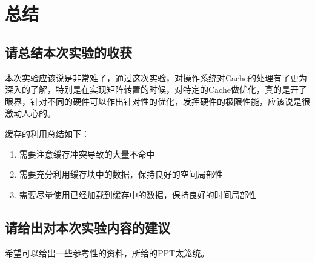 \section{总结}

\subsection{请总结本次实验的收获}
本次实验应该说是非常难了，通过这次实验，对操作系统对Cache的处理有了更为深入的了解，特别是在实现矩阵转置的时候，对特定的Cache做优化，真的是开了眼界，针对不同的硬件可以作出针对性的优化，发挥硬件的极限性能，应该说是很激动人心的。

缓存的利用总结如下：

\begin{enumerate}
    \item 需要注意缓存冲突导致的大量不命中
    \item 需要充分利用缓存块中的数据，保持良好的空间局部性
    \item 需要尽量使用已经加载到缓存中的数据，保持良好的时间局部性
\end{enumerate}

\subsection{请给出对本次实验内容的建议}
希望可以给出一些参考性的资料，所给的PPT太笼统。